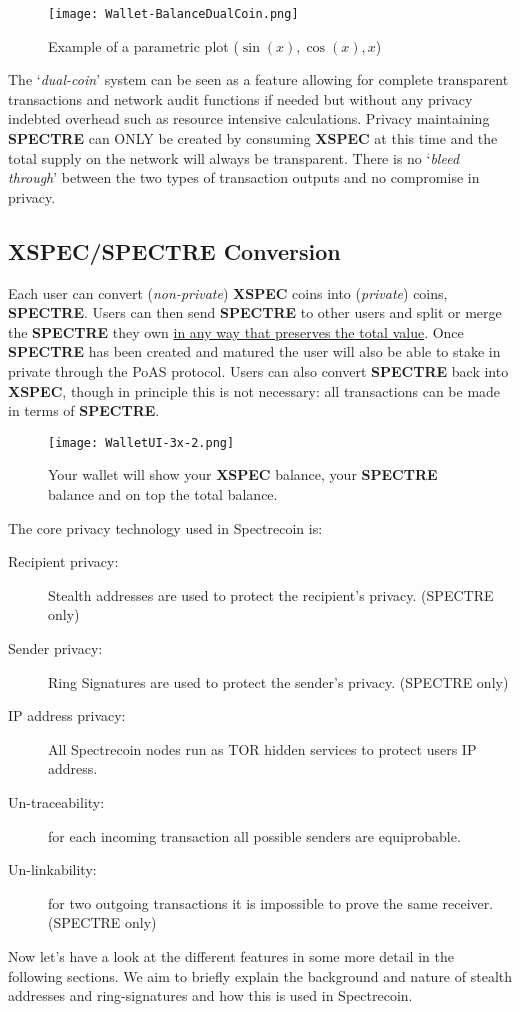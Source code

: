 \begin{figure}[ht]
	\caption{Example of a parametric plot ($\sin (x), \cos(x), x$)}
	\centering
	\texttt{[image: Wallet-BalanceDualCoin.png]}
\end{figure}



The ‘\textit{dual-coin}’ system can be seen as a feature allowing for complete
transparent transactions and network audit functions if needed but
without any privacy indebted overhead such as resource intensive
calculations. Privacy maintaining \textbf{SPECTRE} can ONLY be created by
consuming \textbf{XSPEC} at this time and the total supply on the network
will always be transparent. There is no ‘\textit{bleed through}’ between the
two types of transaction outputs and no compromise in privacy.



\subsection{XSPEC/SPECTRE Conversion}
Each user can convert (\textit{non-private}) \textbf{XSPEC} coins into (\textit{private}) coins, \textbf{SPECTRE}.
Users can then send \textbf{SPECTRE} to other users and split or merge the \textbf{SPECTRE} they
own \underline{in any way that preserves the total value}. Once \textbf{SPECTRE} has been created
and matured the user will also be able to stake in private through the PoAS
protocol. Users can also convert \textbf{SPECTRE} back into \textbf{XSPEC}, though in principle
this is not necessary: all transactions can be made in terms of \textbf{SPECTRE}.



\begin{figure}[ht]
	\caption{Your wallet will show your \textbf{XSPEC} balance, your 
		\textbf{SPECTRE} balance and on top the total balance.}
	\centering
	\texttt{[image: WalletUI-3x-2.png]}
\end{figure}




The core privacy technology used in Spectrecoin is: 



\begin{description}
	\item[Recipient privacy:] Stealth addresses are used to protect the recipient’s privacy. (SPECTRE only)
	\item[Sender privacy:] Ring Signatures are used to protect the sender’s privacy. (SPECTRE only)
	\item[IP address privacy:] All Spectrecoin nodes run as TOR hidden services to protect users IP address.
	\item[Un-traceability:] for each incoming transaction all possible senders are equiprobable.
	\item[Un-linkability:] for two outgoing transactions it is impossible to prove the same receiver. (SPECTRE only)
\end{description}
         



Now let’s have a look at the different features in some more detail in the
following sections. We aim to briefly explain the background and nature of
stealth addresses and ring-signatures and how this is used in Spectrecoin.
